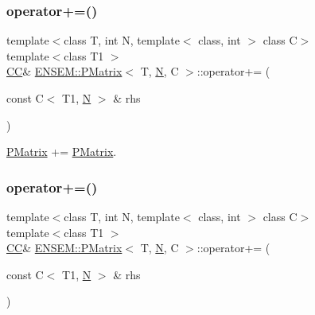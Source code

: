 \subsubsection{\texorpdfstring{operator+=()}{operator+=()}\hspace{0.1cm}{\footnotesize\ttfamily [1/6]}}
{\footnotesize\ttfamily template$<$class T, int N, template$<$ class, int $>$ class C$>$ \\
template$<$class T1 $>$ \\
\mbox{\hyperlink{classENSEM_1_1PMatrix_a744bac549029029effe32dc1705660ec}{CC}}\& \mbox{\hyperlink{classENSEM_1_1PMatrix}{E\+N\+S\+E\+M\+::\+P\+Matrix}}$<$ T, \mbox{\hyperlink{adat__devel_2lib_2hadron_2operator__name__util_8cc_a7722c8ecbb62d99aee7ce68b1752f337}{N}}, C $>$\+::operator+= (\begin{DoxyParamCaption}\item[{const C$<$ T1, \mbox{\hyperlink{adat__devel_2lib_2hadron_2operator__name__util_8cc_a7722c8ecbb62d99aee7ce68b1752f337}{N}} $>$ \&}]{rhs }\end{DoxyParamCaption})\hspace{0.3cm}{\ttfamily [inline]}}



\mbox{\hyperlink{classENSEM_1_1PMatrix}{P\+Matrix}} += \mbox{\hyperlink{classENSEM_1_1PMatrix}{P\+Matrix}}. 

\mbox{\label{classENSEM_1_1PMatrix_af6bd651888f2621169845b757b2200ee}} 
\subsubsection{\texorpdfstring{operator+=()}{operator+=()}\hspace{0.1cm}{\footnotesize\ttfamily [2/6]}}
{\footnotesize\ttfamily template$<$class T, int N, template$<$ class, int $>$ class C$>$ \\
template$<$class T1 $>$ \\
\mbox{\hyperlink{classENSEM_1_1PMatrix_a744bac549029029effe32dc1705660ec}{CC}}\& \mbox{\hyperlink{classENSEM_1_1PMatrix}{E\+N\+S\+E\+M\+::\+P\+Matrix}}$<$ T, \mbox{\hyperlink{adat__devel_2lib_2hadron_2operator__name__util_8cc_a7722c8ecbb62d99aee7ce68b1752f337}{N}}, C $>$\+::operator+= (\begin{DoxyParamCaption}\item[{const C$<$ T1, \mbox{\hyperlink{adat__devel_2lib_2hadron_2operator__name__util_8cc_a7722c8ecbb62d99aee7ce68b1752f337}{N}} $>$ \&}]{rhs }\end{DoxyParamCaption})\hspace{0.3cm}{\ttfamily [inline]}}




